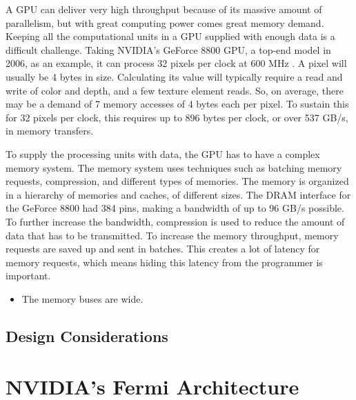 \documentclass[../main/report.tex]{subfiles}
\begin{document}
A GPU can deliver very high throughput because of its massive amount of parallelism, but with great computing power comes great memory demand.
Keeping all the computational units in a GPU supplied with enough data is a difficult challenge.
Taking NVIDIA's GeForce 8800 GPU, a top-end model in 2006, as an example, it can process 32 pixels per clock at 600 MHz \cite{gpu_appendix}.
A pixel will usually be 4 bytes in size.
Calculating its value will typically require a read and write of color and depth, and a few texture element reads.
So, on average, there may be a demand of 7 memory accesses of 4 bytes each per pixel.
To sustain this for 32 pixels per clock, this requires up to 896 bytes per clock, or over 537 GB/s, in memory transfers.

To supply the processing units with data, the GPU has to have a complex memory system. 
The memory system uses techniques such as batching memory requests, compression, and different types of memories.
The memory is organized in a hierarchy of memories and caches, of different sizes.
The DRAM interface for the GeForce 8800 had 384 pins, making a bandwidth of up to 96 GB/s possible.
To further increase the bandwidth, compression is used to reduce the amount of data that has to be transmitted.
To increase the memory throughput, memory requests are saved up and sent in batches.
This creates a lot of latency for memory requests, which means hiding this latency from the programmer is important.
 
\begin{itemize}
	\item The memory buses are wide.
\end{itemize}


\subsection{Design Considerations}


\section{NVIDIA's Fermi Architecture} %
\end{document}
